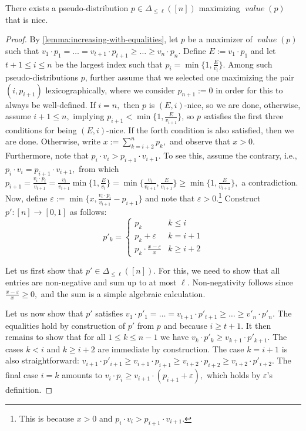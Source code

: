 \documentclass[sigconf,nonacm]{aamas}
\DeclareMathOperator{\valueText}{\textit{value}}
\newcommand{\val}[1]{\valueText({#1})}
\begin{document}
\begin{lemma}\label{lemma:full-characterization} There exists a pseudo-distribution $p \in \Delta_{\leq \ell}([n])$ maximizing $\val{p}$ that is nice.
\end{lemma}
\begin{proof}%
By \cref{lemma:increasing-with-equalities}, let $p$ be a maximizer of $\val{p}$ such that $v_1 \cdot p_1 = \dots = v_{t + 1} \cdot p_{t + 1} \geq \dots \geq v_n \cdot p_n$. Define $E := v_1 \cdot p_1$ and let $t + 1 \leq i \leq n$ be the largest index such that $p_i = \min\{1, \frac{E}{v_i}\}$. Among such pseudo-distributions $p$, further assume that we selected one maximizing the pair $(i, p_{i + 1})$ lexicographically, where we consider $p_{n + 1} := 0$ in order for this to always be well-defined. If $i = n,$ then $p$ is $(E, i)$-nice, so we are done, otherwise, assume $i + 1 \leq n,$ implying $p_{i + 1} < \min\{1, \frac{E}{v_{i + 1}}\}$, so $p$ satisfies the first three conditions for being $(E, i)$-nice. If the forth condition is also satisfied, then we are done. Otherwise, write $x := \sum_{k = i + 2}^n p_k,$ and observe that $x > 0$. Furthermore, note that $p_i \cdot v_i > p_{i + 1} \cdot v_{i + 1}.$ To see this, assume the contrary, i.e., $p_i \cdot v_i = p_{i + 1} \cdot v_{i + 1},$ from which $p_{i + 1} = \frac{v_i \cdot p_i}{v_{i + 1}} = \frac{v_i}{v_{i + 1}} \min\{1, \frac{E}{v_i}\} = \min\{\frac{v_i}{v_{i + 1}}, \frac{E}{v_{i + 1}}\} \geq \min\{1, \frac{E}{v_{i + 1}}\},$ a contradiction. Now, define $\varepsilon := \min\{x, \frac{v_i \cdot p_i}{v_{i + 1}} - p_{i + 1}\}$ and note that $\varepsilon > 0.$\footnote{This is because $x > 0$ and $p_i \cdot v_i > p_{i + 1} \cdot v_{i + 1}.$} Construct $p' : [n] \to [0, 1]$ as follows:%
%
\begin{equation*}
    p'_k = \left\{
    \begin{array}{ll}
          p_k & k \leq i \\
          p_k + \varepsilon & k = i + 1 \\
          p_k \cdot \frac{x - \varepsilon}{x} & k \geq i + 2
    \end{array}
    \right.
\end{equation*}

Let us first show that $p' \in \Delta_{\leq \ell}([n])$. For this, we need to show that all entries are non-negative and sum up to at most $\ell$. Non-negativity follows since $\frac{x - \varepsilon}{x} \geq 0,$ and the sum is a simple algebraic calculation.

Let us now show that $p'$ satisfies $v_1 \cdot p'_1 = \dots = v_{t + 1} \cdot p'_{t + 1} \geq \dots \geq v'_n \cdot p'_n.$ The equalities hold by construction of $p'$ from $p$ and because $i \geq t + 1.$ It then remains to show that for all $1 \leq k \leq n - 1$ we have $v_k \cdot p'_k \geq v_{k + 1} \cdot p'_{k + 1}.$ The cases $k < i$ and $k \geq i + 2$ are immediate by construction. The case $k = i + 1$ is also straightforward: $v_{i + 1} \cdot p'_{i + 1} \geq v_{i + 1} \cdot p_{i + 1} \geq v_{i + 2} \cdot p_{i + 2} \geq v_{i + 2} \cdot p'_{i + 2}.$ The final case $i = k$ amounts to $v_i \cdot p_i \geq v_{i + 1} \cdot (p_{i + 1} + \varepsilon),$ which holds by $\varepsilon$'s definition.


\end{proof}
\end{document}
